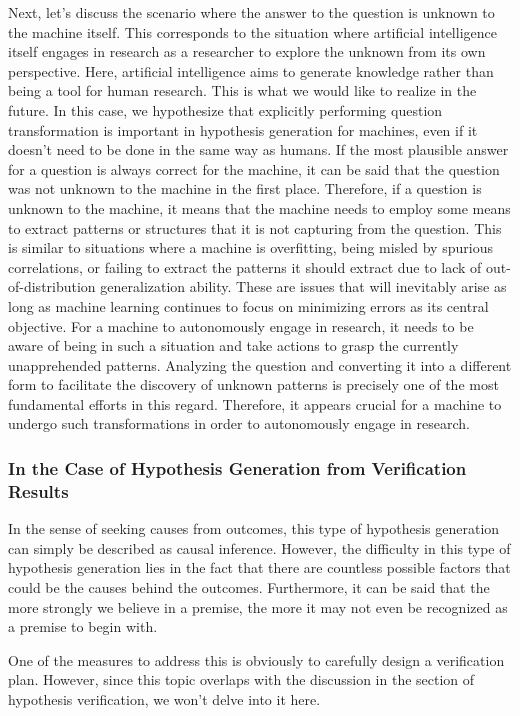 \documentclass{book}
\begin{document}
Next, let's discuss the scenario where the answer to the question is unknown to the machine itself. This corresponds to the situation where artificial intelligence itself engages in research as a researcher to explore the unknown from its own perspective. Here, artificial intelligence aims to generate knowledge rather than being a tool for human research. This is what we would like to realize in the future. In this case, we hypothesize that explicitly performing question transformation is important in hypothesis generation for machines, even if it doesn't need to be done in the same way as humans. If the most plausible answer for a question is always correct for the machine, it can be said that the question was not unknown to the machine in the first place. Therefore, if a question is unknown to the machine, it means that the machine needs to employ some means to extract patterns or structures that it is not capturing from the question. This is similar to situations where a machine is overfitting, being misled by spurious correlations, or failing to extract the patterns it should extract due to lack of out-of-distribution generalization ability. These are issues that will inevitably arise as long as machine learning continues to focus on minimizing errors as its central objective. For a machine to autonomously engage in research, it needs to be aware of being in such a situation and take actions to grasp the currently unapprehended patterns. Analyzing the question and converting it into a different form to facilitate the discovery of unknown patterns is precisely one of the most fundamental efforts in this regard. Therefore, it appears crucial for a machine to undergo such transformations in order to autonomously engage in research.

\subsubsection{In the Case of Hypothesis Generation from Verification Results}
In the sense of seeking causes from outcomes, this type of hypothesis generation can simply be described as causal inference. However, the difficulty in this type of hypothesis generation lies in the fact that there are countless possible factors that could be the causes behind the outcomes. Furthermore, it can be said that the more strongly we believe in a premise, the more it may not even be recognized as a premise to begin with.

One of the measures to address this is obviously to carefully design a verification plan. However, since this topic overlaps with the discussion in the section of hypothesis verification, we won't delve into it here.
\end{document}
